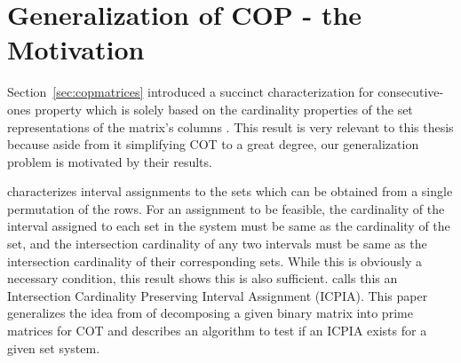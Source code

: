 





\section[Generalization of COP]{Generalization of COP - the Motivation}
\label{sec:motive}
Section~\ref{sec:copmatrices} introduced a succinct characterization
for consecutive-ones property which is solely based on the cardinality
properties of the set representations of the matrix's columns
\cite{nsnrs09}. This result is very relevant to this thesis because
aside from it simplifying COT to a great degree, our generalization
problem is motivated by their results.

\cite{nsnrs09} characterizes interval assignments to the sets which
can be obtained from a single permutation of the rows.  For an
assignment to be feasible, the cardinality of the interval assigned to
each set in the system must be same as the cardinality of the set, and
the intersection cardinality of any two intervals must be same as the
intersection cardinality of their corresponding sets.  While this is
obviously a necessary condition, this result shows this is also
sufficient.  \cite{nsnrs09} calls this an Intersection Cardinality
Preserving Interval Assignment (ICPIA).  This paper generalizes the
idea from \cite{wlh02} of decomposing a given binary matrix into prime
matrices for COT and describes an algorithm to test if an ICPIA exists
for a given set system.

